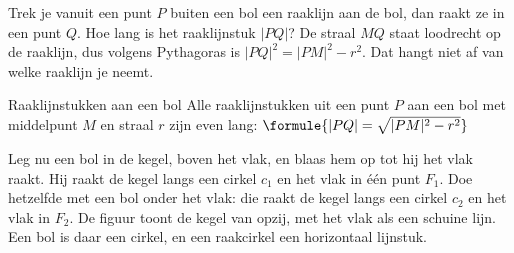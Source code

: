 Trek je vanuit een punt $P$ buiten een bol een raaklijn aan de bol, dan raakt ze in een punt $Q$. Hoe lang is het raaklijnstuk $|PQ|$? De straal $MQ$ staat loodrecht op de raaklijn, dus volgens Pythagoras is $|PQ|^2 = |PM|^2 - r^2$. Dat hangt niet af van welke raaklijn je neemt.

\begin{theorie}
\begin{minipage}[t]{.64\linewidth}
\vspace{0pt}
\begin{stelling}{Raaklijnstukken aan een bol}
Alle raaklijnstukken uit een punt $P$ aan een bol met middelpunt $M$ en straal $r$ zijn even lang: \quad $\formule{|PQ| = \sqrt{|PM|^2 - r^2}}$
\end{stelling}
\end{minipage}\hfill
\begin{minipage}[t]{.32\linewidth}
\vspace{0pt}
\centering
{}
\end{minipage}
\end{theorie}

Leg nu een bol in de kegel, boven het vlak, en blaas hem op tot hij het vlak raakt. Hij raakt de kegel langs een cirkel $c_1$ en het vlak in één punt $F_1$. Doe hetzelfde met een bol onder het vlak: die raakt de kegel langs een cirkel $c_2$ en het vlak in $F_2$. De figuur toont de kegel van opzij, met het vlak als een schuine lijn. Een bol is daar een cirkel, en een raakcirkel een horizontaal lijnstuk.

